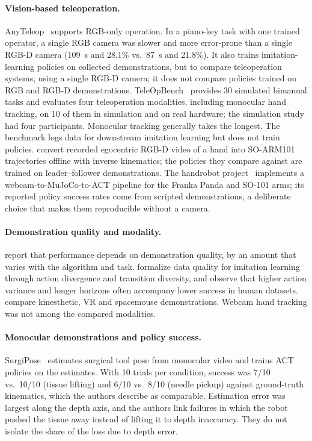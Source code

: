\documentclass[10pt]{article}
\begin{document}
\paragraph{Vision-based teleoperation.}
AnyTeleop~\citep{qin2023anyteleop} supports RGB-only operation. In a piano-key task with one trained operator, a single RGB camera was slower and more error-prone than a single RGB-D camera (109~s and 28.1\% vs.\ 87~s and 21.8\%).
It also trains imitation-learning policies on collected demonstrations, but to compare teleoperation systems, using a single RGB-D camera; it does not compare policies trained on RGB and RGB-D demonstrations.
TeleOpBench~\citep{teleopbench2025} provides 30 simulated bimanual tasks and evaluates four teleoperation modalities, including monocular hand tracking, on 10 of them in simulation and on real hardware; the simulation study had four participants.
Monocular tracking generally takes the longest. The benchmark logs data for downstream imitation learning but does not train policies.
\citet{chiche2026shadowing} convert recorded egocentric RGB-D video of a hand into SO-ARM101 trajectories offline with inverse kinematics; the policies they compare against are trained on leader--follower demonstrations.
The handrobot project~\citep{handrobot} implements a webcam-to-MuJoCo-to-ACT pipeline for the Franka Panda and SO-101 arms; its reported policy success rates come from scripted demonstrations, a deliberate choice that makes them reproducible without a camera.

\paragraph{Demonstration quality and modality.}
\citet{mandlekar2021robomimic} report that performance depends on demonstration quality, by an amount that varies with the algorithm and task.
\citet{belkhale2023dataquality} formalize data quality for imitation learning through action divergence and transition diversity, and observe that higher action variance and longer horizons often accompany lower success in human datasets.
\citet{li2025modality} compare kinesthetic, VR and spacemouse demonstrations.
Webcam hand tracking was not among the compared modalities.

\paragraph{Monocular demonstrations and policy success.}
SurgiPose~\citep{chen2025surgipose} estimates surgical tool pose from monocular video and trains ACT policies on the estimates.
With 10 trials per condition, success was 7/10 vs.\ 10/10 (tissue lifting) and 6/10 vs.\ 8/10 (needle pickup) against ground-truth kinematics, which the authors describe as comparable.
Estimation error was largest along the depth axis, and the authors link failures in which the robot pushed the tissue away instead of lifting it to depth inaccuracy.
They do not isolate the share of the loss due to depth error.
\end{document}
